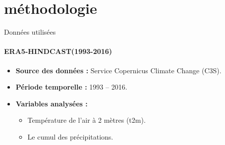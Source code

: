 \section{méthodologie}
\begin{frame}{Données utilisées}
\framesubtitle{ERA5-HINDCAST(1993-2016)}

  \begin{itemize}
    \item \textbf{Source des données :} Service Copernicus Climate Change (C3S).
    \item \textbf{Période temporelle :} 1993 -- 2016.
    \item \textbf{Variables analysées :}
    \begin{itemize}
      \item Température de l'air à 2 mètres (t2m).
      \item Le cumul des précipitations.
      
    \end{itemize}
  
  \end{itemize}
\end{frame}

